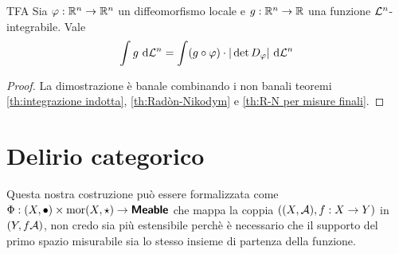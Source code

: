 \documentclass{article}
\begin{document}
\begin{theorem}{TFA}{}
    Sia $\varphi : \mathbb{R}^n \to \mathbb{R}^n$ un diffeomorfismo locale e $g : \mathbb{R}^n \to \mathbb{R}$ una funzione $\mathcal{L}^n$-integrabile. Vale
    \[\int\limits g \text{ d} \mathcal{L}^n = \int (g \circ \varphi)\cdot |\det D_\varphi|\text{ d} \mathcal{L}^n\]
    \begin{proof}
        La dimostrazione è banale combinando i non banali teoremi \ref{th:integrazione indotta}, \ref{th:Radòn-Nikodym} e \ref{th:R-N per misure finali}.
    \end{proof}
\end{theorem}

\section{Delirio categorico}

Questa nostra costruzione può essere formalizzata come $\Phi : (X,\bullet) \times \operatorname{mor}(X,\star) \to \text{\sffamily\textbf{Meable}}$ che mappa la coppia $((X,\mathcal{A}), f:X\to Y)$ in $(Y,f\mathcal{A})$, non credo sia più estensibile perchè è necessario che il supporto del primo spazio misurabile sia lo stesso insieme di partenza della funzione.
\end{document}
